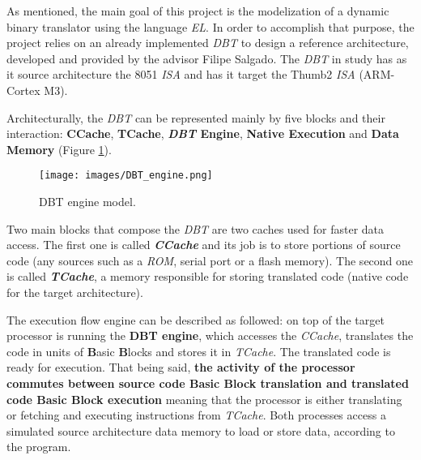 
As mentioned, the main goal of this project is the modelization of a dynamic binary translator using the language \textit{EL}. In order to accomplish that purpose, the project relies on an already implemented \textit{DBT} to design a reference architecture, developed and provided by the advisor Filipe Salgado. The \textit{DBT} in study has as it source architecture the 8051 \textit{ISA} and has it target the Thumb2 \textit{ISA }(ARM-Cortex M3). 

Architecturally, the \textit{DBT}  can be represented mainly by five blocks and their interaction: \textbf{CCache}, \textbf{TCache}, \textbf{\textit{DBT} Engine}, \textbf{Native Execution} and \textbf{Data Memory} (Figure \ref{fig:DBT_Engine}).

\begin{figure}[!htb]
\centering
\texttt{[image: images/DBT\_engine.png]}
\caption{DBT engine model.}
\label{fig:DBT_Engine} 
\end{figure}

Two main blocks that compose the \textit{DBT} are two caches used for faster data access. The first one is called \textit{\textbf{CCache}} and its job is to store portions of source code (any sources such as a \textit{ROM}, serial port or a flash memory). The second one is called \textit{\textbf{TCache}}, a memory responsible for storing translated code (native code for the target architecture).

The execution flow engine can be described as followed: on top of the target processor is running the \textbf{DBT engine}, which accesses the \textit{CCache}, translates the code in units of \textbf{B}asic \textbf{B}locks and stores it in \textit{TCache}. The translated code is ready for execution. That being said, \textbf{the activity of the processor commutes between source code Basic Block translation and translated code Basic Block execution} meaning that the processor is either translating or fetching and executing instructions from \textit{TCache}. Both processes access a simulated source architecture data memory to load or store data, according to the program. \cite{DBT1}


